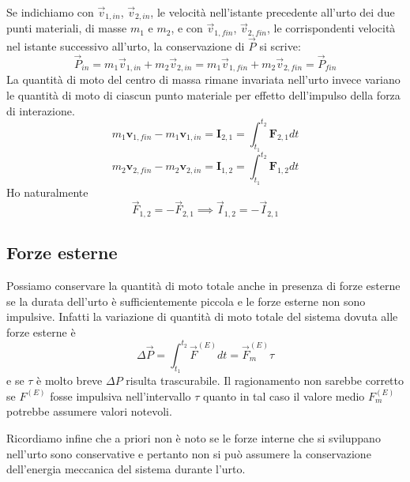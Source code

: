 \documentclass[class=book, crop=false, oneside, 12pt]{standalone}
\begin{document}
Se indichiamo con \(\overrightarrow{v}_{1,in}\), \(\overrightarrow{v}_{2,in}\), le velocità nell'istante precedente all'urto dei due punti materiali, di masse \(m_1\) e \(m_2\), e con \(\overrightarrow{v}_{1,fin}\), \(\overrightarrow{v}_{2,fin}\), le corrispondenti velocità nel istante successivo all'urto, la conservazione di \(\overrightarrow{P}\) si scrive:
\begin{equation}
    \overrightarrow{P}_{in} = m_1 \overrightarrow{v}_{1,in} + m_2 \overrightarrow{v}_{2,in} = m_1 \overrightarrow{v}_{1,fin} + m_2 \overrightarrow{v}_{2,fin} = \overrightarrow{P}_{fin}
\end{equation}
La quantità di moto del centro di massa rimane invariata nell'urto invece variano le quantità di moto di ciascun punto materiale per effetto dell'impulso della forza di interazione.
\begin{equation*}
    m_{1} \boldsymbol{v}_{1, fin}-m_{1} \boldsymbol{v}_{1, in}=\mathbf{I}_{2,1}=\int_{t_1}^{t_2} \mathbf{F}_{2,1} d t
\end{equation*}
\begin{equation*}
    m_{2} \boldsymbol{v}_{2, fin}-m_{2} \boldsymbol{v}_{2, in}=\mathbf{I}_{1,2}=\int_{t_1}^{t_2} \mathbf{F}_{1,2} d t
\end{equation*}
Ho naturalmente
\begin{equation*}
    \overrightarrow{F}_{1,2} = - \overrightarrow{F}_{2,1} \implies \overrightarrow{I}_{1,2} = - \overrightarrow{I}_{2,1}
\end{equation*}

\subsection{Forze esterne}

Possiamo conservare la quantità di moto totale anche in presenza di forze esterne se la durata dell'urto è sufficientemente piccola e le forze esterne non sono impulsive.
Infatti la variazione di quantità di moto totale del sistema dovuta alle forze esterne è
\begin{equation*}
    \Delta \overrightarrow{P} = \int_{t_1}^{t_2} \overrightarrow{F}^{(E)} dt = \overrightarrow{F}_m^{(E)} \tau
\end{equation*}
e se \(\tau\) è molto breve \(\Delta P\) risulta trascurabile.
Il ragionamento non sarebbe corretto se \(F^{(E)}\) fosse impulsiva nell'intervallo \(\tau\) quanto in tal caso il valore medio \(F_m^{(E)}\) potrebbe assumere valori notevoli.

Ricordiamo infine che a priori non è noto se le forze interne che si sviluppano nell'urto sono conservative e pertanto non si può assumere la conservazione dell'energia meccanica del sistema durante l'urto.
\end{document}
